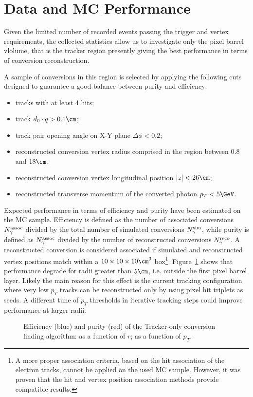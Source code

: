 \section{Data and MC Performance}
\label{dataVsMc}
Given the limited number of recorded events passing the trigger and
vertex requirements, the collected statistics allow us to investigate
only the pixel barrel vlolume, that is the tracker region presently
giving the best performance in terms of conversion reconstruction.

A sample of conversions in this region is selected by applying the
following cuts designed to guarantee a good balance between purity and
efficiency:
\begin{itemize}
\item tracks with at least 4 hits;
\item track $d_0\cdot q > 0.1\cm$;
\item track pair opening angle on X-Y plane $\Delta\phi<0.2$;
\item reconstructed conversion vertex radius comprised in the region between $0.8$ and $18\cm$;
\item reconstructed conversion vertex longitudinal position $|z|< 26\cm$;
\item reconstructed transverse momentum of the converted photon $p_T<5\GeV$.
\end{itemize}

Expected performance in terms of efficiency and purity have been
estimated on the MC sample.
Efficiency is defined as the number of associated conversions
$N^{\rm assoc}_{\gamma}$ divided by the total number of simulated
conversions $N^{\rm sim}_{\gamma}$, while purity is defined as
$N^{\rm assoc}_{\gamma}$ divided by the number of reconstructed
conversions $N^{\rm reco}_{\gamma}$.
A reconstructed conversion is considered associated if simulated and reconstructed vertex positions match within a $10\times10\times10\cm^3$ 
box\footnote{A more proper association criteria, based on the hit
  association of the electron tracks, cannot be applied on the used MC
  sample. However, it was proven that the hit and vertex position
  association methods provide compatible results.}.
Figure~\ref{efficpurity} shows that performance degrade for radii greater than $5\cm$, i.e. outside the first pixel barrel layer.
Likely the main reason for this effect is the current tracking configuration where very low $p_T$ tracks can be reconstructed only by using pixel hit triplets as seeds. A different tune of $p_T$ thresholds in iterative tracking steps  could improve performance at larger radii.
\begin{figure}[!hbtp]
\caption{Efficiency (blue) and purity (red) of the Tracker-only conversion finding algorithm:  as a function of $r$;  as a function of $p_T$.}
\label{efficpurity}
\end{figure}

